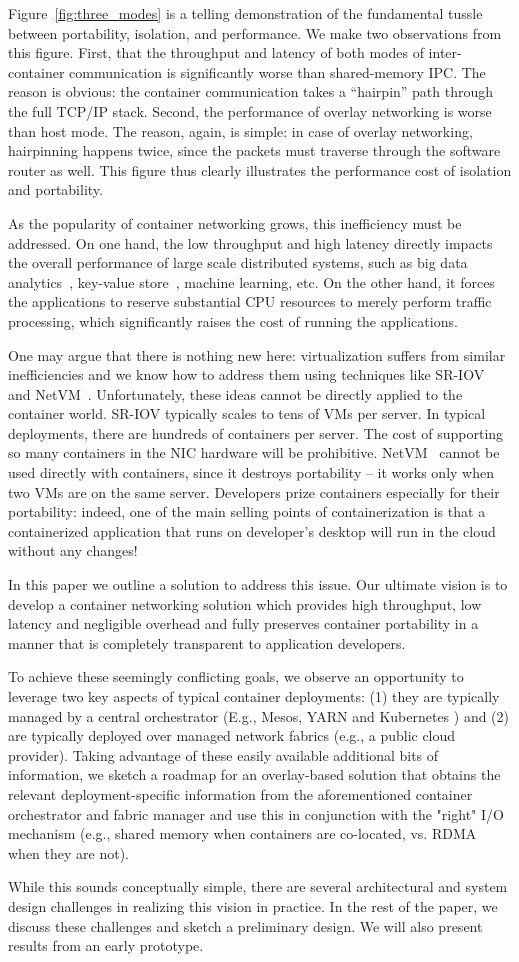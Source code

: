 Figure~\ref{fig:three_modes} is a telling demonstration of the fundamental
tussle between portability, isolation, and performance. We make two
observations from this figure. First, that the throughput and latency of both
modes of inter-container communication is significantly worse than
shared-memory IPC. The reason is obvious: the container communication takes a
``hairpin'' path through the full TCP/IP stack. Second, the performance of
overlay networking is worse than host mode. The reason, again, is simple: in
case of overlay networking, hairpinning happens twice, since the packets must
traverse through the software router as well. This figure thus clearly
illustrates the performance cost of isolation and portability.

As the popularity of container networking grows, this inefficiency must be
addressed. On one hand, the low throughput and high latency directly impacts the
overall performance of large scale distributed systems, such as big data
analytics~\cite{varys,orchestra,reining,chowdhury}, key-value
store~\cite{farm}, machine learning, etc. On the other hand,
it forces the applications to reserve substantial CPU resources to merely
perform traffic processing, which significantly raises the cost of running the
applications.

One may argue that there is nothing new here: virtualization suffers from
similar inefficiencies and we know how to address them using techniques like
SR-IOV~\cite{sriov} and NetVM~\cite{netvm}. Unfortunately, these ideas cannot be
directly applied to the container world. SR-IOV typically scales to tens of VMs
per server. In typical deployments, there are hundreds of containers per server.
The cost of supporting so many containers in the NIC hardware will be
prohibitive. NetVM~\cite{netvm} cannot be used directly with containers, since
it destroys portability -- it works only when two VMs are on the same server.
Developers prize containers especially for their portability: indeed, one of the
main selling points of containerization is that a containerized application that
runs on developer's desktop will run in the cloud without any changes! 

In this paper we outline a solution to address this issue. Our ultimate vision
is to develop a container networking solution which provides high throughput,
low latency and negligible overhead and fully preserves container portability in
a manner that is completely transparent to application developers. 

To achieve these seemingly conflicting goals, we observe an opportunity to
leverage two key aspects of typical container deployments: (1) they are
typically managed by a central orchestrator (E.g., Mesos, YARN and Kubernetes
\cite{mesos,yarn,kubernetes}) and (2) are typically deployed over managed network
fabrics (e.g., a public cloud provider). Taking advantage of these easily
available additional bits of information, we sketch a roadmap for an
overlay-based solution that obtains the relevant deployment-specific
information from the aforementioned container orchestrator and fabric manager
and use this in conjunction with the "right" I/O mechanism (e.g., shared memory
when containers are co-located, vs. RDMA when they are not). 

While this sounds conceptually simple, there are several architectural
and system design challenges in realizing this vision in practice. In the rest
of the paper, we discuss these challenges and sketch a preliminary design. We
will also present results from an early prototype.
